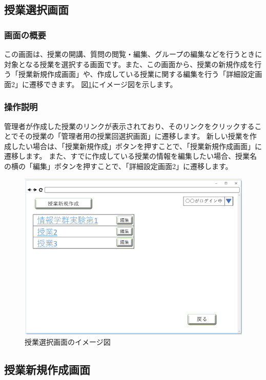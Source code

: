 \newpage

\subsection{授業選択画面}
\subsubsection{画面の概要}
この画面は、授業の開講、質問の閲覧・編集、グループの編集などを行うときに対象となる授業を選択する画面です。また、この画面から、授業の新規作成を行う「授業新規作成画面」や、作成している授業に関する編集を行う「詳細設定画面2」に遷移できます。
図\ref{fig:09}にイメージ図を示します。

\subsubsection{操作説明}
管理者が作成した授業のリンクが表示されており、そのリンクをクリックすることでその授業の「管理者用の授業回選択画面」に遷移します。
新しい授業を作成したい場合は、「授業新規作成」ボタンを押すことで、「授業新規作成画面」に遷移します。
また、すでに作成している授業の情報を編集したい場合、授業名の横の「編集」ボタンを押すことで、「詳細設定画面2」に遷移します。

\begin{figure}[htbp]
  \begin{center}
    \includegraphics[width=0.7\linewidth,clip]{./img/09.png}
    \caption{授業選択画面のイメージ図}\label{fig:09}
  \end{center}
\end{figure}

\newpage

\subsection{授業新規作成画面}
